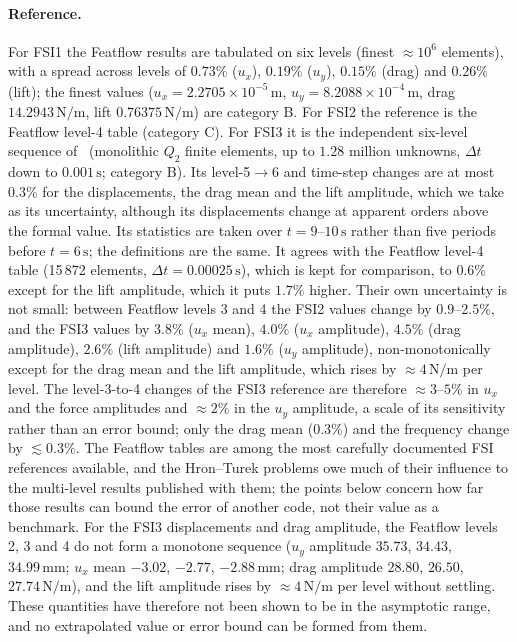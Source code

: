 \paragraph{Reference.}
For FSI1 the Featflow results are tabulated on six levels (finest $\approx10^6$ elements), with a spread across levels of $0.73\%$ ($u_x$), $0.19\%$ ($u_y$), $0.15\%$ (drag) and $0.26\%$ (lift); the finest values ($u_x = 2.2705\times10^{-5}\,\mathrm{m}$, $u_y = 8.2088\times10^{-4}\,\mathrm{m}$, drag $14.2943\,\mathrm{N/m}$, lift $0.76375\,\mathrm{N/m}$) are category B.
For FSI2 the reference is the Featflow level-4 table (category C). For FSI3 it is the independent six-level sequence of~\citet{Failer2020} (monolithic $Q_2$ finite elements, up to $1.28$ million unknowns, $\Delta t$ down to $0.001\,\mathrm{s}$; category B). Its level-5$\to$6 and time-step changes are at most $0.3\%$ for the displacements, the drag mean and the lift amplitude, which we take as its uncertainty, although its displacements change at apparent orders above the formal value. Its statistics are taken over $t = 9$--$10\,\mathrm{s}$ rather than five periods before $t = 6\,\mathrm{s}$; the definitions are the same. It agrees with the Featflow level-4 table (15\,872 elements, $\Delta t = 0.00025\,\mathrm{s}$), which is kept for comparison, to $0.6\%$ except for the lift amplitude, which it puts $1.7\%$ higher.
Their own uncertainty is not small: between Featflow levels 3 and 4 the FSI2 values change by $0.9$--$2.5\%$, and the FSI3 values by $3.8\%$ ($u_x$ mean), $4.0\%$ ($u_x$ amplitude), $4.5\%$ (drag amplitude), $2.6\%$ (lift amplitude) and $1.6\%$ ($u_y$ amplitude), non-monotonically except for the drag mean and the lift amplitude, which rises by $\approx4\,\mathrm{N/m}$ per level.
The level-3-to-4 changes of the FSI3 reference are therefore $\approx3$--$5\%$ in $u_x$ and the force amplitudes and $\approx2\%$ in the $u_y$ amplitude, a scale of its sensitivity rather than an error bound; only the drag mean ($0.3\%$) and the frequency change by $\lesssim0.3\%$.
The Featflow tables are among the most carefully documented FSI references available, and the Hron--Turek problems owe much of their influence to the multi-level results published with them; the points below concern how far those results can bound the error of another code, not their value as a benchmark.
For the FSI3 displacements and drag amplitude, the Featflow levels 2, 3 and 4 do not form a monotone sequence ($u_y$ amplitude $35.73$, $34.43$, $34.99\,\mathrm{mm}$; $u_x$ mean $-3.02$, $-2.77$, $-2.88\,\mathrm{mm}$; drag amplitude $28.80$, $26.50$, $27.74\,\mathrm{N/m}$), and the lift amplitude rises by $\approx4\,\mathrm{N/m}$ per level without settling. These quantities have therefore not been shown to be in the asymptotic range, and no extrapolated value or error bound can be formed from them.
